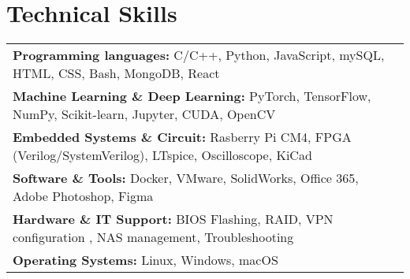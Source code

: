 \documentclass[letterpaper,11pt]{article}
\begin{document}
\section*{Technical Skills}
\begin{tabularx}{\textwidth}{X}
\textbf{Programming languages:} C/C++, Python, JavaScript, mySQL, HTML, CSS, Bash, MongoDB, React\\
\textbf{Machine Learning \& Deep Learning:} PyTorch, TensorFlow, NumPy, Scikit-learn, Jupyter, CUDA, OpenCV\\
\textbf{Embedded Systems \& Circuit:} Rasberry Pi CM4, FPGA (Verilog/SystemVerilog), LTspice, Oscilloscope, KiCad\\
\textbf{Software \& Tools:} Docker, VMware, SolidWorks, Office 365, Adobe Photoshop, Figma \\
\textbf{Hardware \& IT Support:} BIOS Flashing, RAID, VPN configuration , NAS management, Troubleshooting \\
\textbf{Operating Systems:} Linux, Windows, macOS \\
\end{tabularx}
\end{document}
